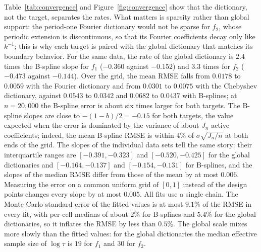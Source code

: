 Table~\ref{tab:convergence} and Figure~\ref{fig:convergence} show that the dictionary, not the target, separates the rates. What matters is sparsity rather than global support: the period-one Fourier dictionary would not be sparse for $f_2$, whose periodic extension is discontinuous, so that its Fourier coefficients decay only like $k^{-1}$; this is why each target is paired with the global dictionary that matches its boundary behavior. For the same data, the rate of the global dictionary is $2.4$ times the B-spline slope for $f_1$ ($-0.360$ against $-0.152$) and $3.3$ times for $f_2$ ($-0.473$ against $-0.144$). Over the grid, the mean RMSE falls from $0.0178$ to $0.0059$ with the Fourier dictionary and from $0.0301$ to $0.0075$ with the Chebyshev dictionary, against $0.0543$ to $0.0342$ and $0.0682$ to $0.0437$ with B-splines; at $n=20{,}000$ the B-spline error is about six times larger for both targets. The B-spline slopes are close to $-(1-b)/2=-0.15$ for both targets, the value expected when the error is dominated by the variance of about $J_n$ active coefficients; indeed, the mean B-spline RMSE is within $4\%$ of $\sigma\sqrt{J_n/n}$ at both ends of the grid. The slopes of the individual data sets tell the same story: their interquartile ranges are $[-0.391,-0.323]$ and $[-0.520,-0.425]$ for the global dictionaries and $[-0.164,-0.137]$ and $[-0.154,-0.131]$ for B-splines, and the slopes of the median RMSE differ from those of the mean by at most $0.006$. Measuring the error on a common uniform grid of $[0,1]$ instead of the design points changes every slope by at most $0.005$. All fits use a single chain. The Monte Carlo standard error of the fitted values is at most $9.1\%$ of the RMSE in every fit, with per-cell medians of about $2\%$ for B-splines and $5.4\%$ for the global dictionaries, so it inflates the RMSE by less than $0.5\%$. The global scale mixes more slowly than the fitted values: for the global dictionaries the median effective sample size of $\log\tau$ is $19$ for $f_1$ and $30$ for $f_2$.

